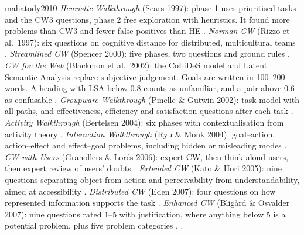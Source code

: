 \begin{papercard}{mahatody2010}
 \emph{Heuristic Walkthrough} (Sears 1997): phase 1 uses prioritised tasks and the CW3 questions, phase 2 free exploration with heuristics. It found more problems than CW3 and fewer false positives than HE . \emph{Norman CW} (Rizzo et al.\ 1997): six questions on cognitive distance for distributed, multicultural teams . \emph{Streamlined CW} (Spencer 2000): five phases, two questions and ground rules . \emph{CW for the Web} (Blackmon et al.\ 2002): the CoLiDeS model and Latent Semantic Analysis replace subjective judgement. Goals are written in 100--200 words. A heading with LSA below 0.8 counts as unfamiliar, and a pair above 0.6 as confusable . \emph{Groupware Walkthrough} (Pinelle \& Gutwin 2002): task model with all paths, and effectiveness, efficiency and satisfaction questions after each task . \emph{Activity Walkthrough} (Bertelsen 2004): six phases with contextualisation from activity theory . \emph{Interaction Walkthrough} (Ryu \& Monk 2004): goal--action, action--effect and effect--goal problems, including hidden or misleading modes . \emph{CW with Users} (Granollers \& Lorés 2006): expert CW, then think-aloud users, then expert review of users' doubts . \emph{Extended CW} (Kato \& Hori 2005): nine questions separating object from action and perceivability from understandability, aimed at accessibility . \emph{Distributed CW} (Eden 2007): four questions on how represented information supports the task . \emph{Enhanced CW} (Bligård \& Osvalder 2007): nine questions rated 1--5 with justification, where anything below 5 is a potential problem, plus five problem categories , .


\end{papercard}
